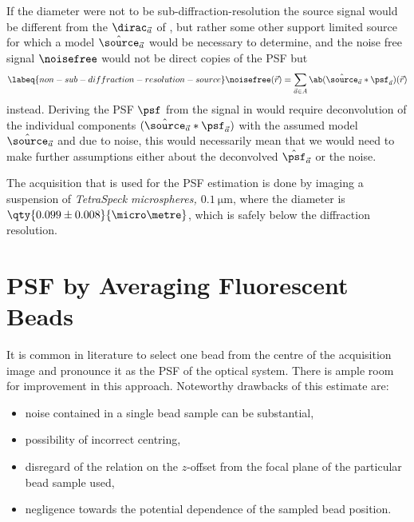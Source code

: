 If the diameter were not to be sub-diffraction-resolution the source signal would be different from the
    \(\dirac_{\vec{a}}\) of , but rather some other support 
    limited source for which a model \(\hat{\source}_{\vec{a}}\) would be necessary to determine, and the noise free
    signal \(\noisefree\) would not be direct copies of the \ac{PSF} but
    \begin{equation}
        \labeq{non-sub-diffraction-resolution-source}
        \noisefree(\vec{r}) = \sum_{\vec{a} \in A} \ab(\hat{\source}_{\vec{a}} * \psf_{\vec{a}})(\vec{r})
    \end{equation}
    instead.
Deriving the \ac{PSF} \(\psf\) from the signal in  would require 
    deconvolution of the individual components \((\hat{\source}_{\vec{a}} * \psf_{\vec{a}})\) with the assumed model 
    \(\hat{\source}_{\vec{a}}\) and due to noise, this would necessarily mean that we would need to make further 
    assumptions either about the deconvolved \(\hat{\psf}_{\vec{a}}\) or the noise.

The acquisition that is used for the \ac{PSF} estimation is done by imaging a suspension of \emph{TetraSpeck\TM 
    microspheres, \(\qty{0.1}{\micro\metre}\)}, where the diameter is 
    \(\qty{0.099 \pm 0.008}{\micro\metre}\), which is safely below the diffraction resolution.




\section{\ac{PSF} by Averaging Fluorescent Beads}%

It is common in literature to select one bead from the centre of the acquisition image and pronounce it as
    the \ac{PSF} of the optical system.
There is ample room for improvement in this approach. 
Noteworthy drawbacks of this estimate are:
    \begin{itemize}
        \item noise contained in a single bead sample can be substantial,
        \item possibility of incorrect centring,
        \item disregard of the relation on the \(z\)-offset from the focal plane of the particular bead 
            sample used,
        \item negligence towards the potential dependence of the sampled bead position.
    \end{itemize}


